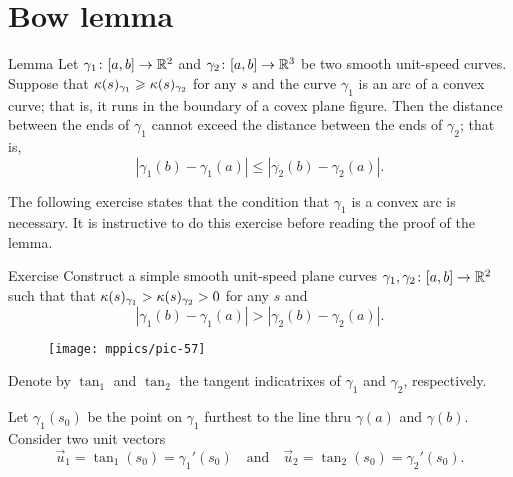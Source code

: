 \section{Bow lemma}

\begin{thm}{Lemma}\label{lem:bow}
Let $\gamma_1\colon[a,b]\to\mathbb{R}^2$ and $\gamma_2\colon[a,b] \to\mathbb{R}^3$ be two smooth unit-speed curves.
Suppose that $\kappa(s)_{\gamma_1}\geqslant\kappa(s)_{\gamma_2}$ for any $s$ 
and the curve
$\gamma_1$ is an arc of a convex curve; that is, it runs in the boundary of a covex plane figure.
Then the distance between the ends of $\gamma_1$ cannot exceed the  distance between the ends of $\gamma_2$; that is,
\[|\gamma_1(b)-\gamma_1(a)|\le |\gamma_2(b)-\gamma_2(a)|.\]

\end{thm}

The following exercise states that the condition that $\gamma_1$ is a convex arc is necessary.
It is instructive to do this exercise before reading the proof of the lemma.

{\sloppy 

\begin{thm}{Exercise}\label{ex:anti-bow}
Construct a simple smooth unit-speed plane curves $\gamma_1,\gamma_2\colon[a,b]\to\mathbb{R}^2$ such that 
that $\kappa(s)_{\gamma_1}>\kappa(s)_{\gamma_2}>0$ for any $s$ and
\[|\gamma_1(b)-\gamma_1(a)|> |\gamma_2(b)-\gamma_2(a)|.\]
\end{thm}

}

\begin{wrapfigure}{o}{36 mm}
\vskip-7mm
\centering
\texttt{[image: mppics/pic-57]}
\vskip0mm
\end{wrapfigure}

Denote by $\tan_1$ and $\tan_2$ the tangent indicatrixes of $\gamma_1$ and $\gamma_2$, respectively.

Let $\gamma_1(s_0)$ be the point on $\gamma_1$ furthest to the line 
thru $\gamma(a)$ and $\gamma(b)$.
Consider two unit vectors 
\[\vec u_1=\tan_1(s_0)=\gamma_1'(s_0)
\quad\text{and}\quad
\vec u_2=\tan_2(s_0)=\gamma_2'(s_0).\]

